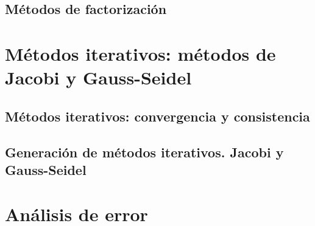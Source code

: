 		\subsection{Métodos de factorización}
		
	\section{Métodos iterativos: métodos de Jacobi y Gauss-Seidel}
		\subsection{Métodos iterativos: convergencia y consistencia}
		\subsection{Generación de métodos iterativos. Jacobi y Gauss-Seidel}
	\section{Análisis de error}
	


